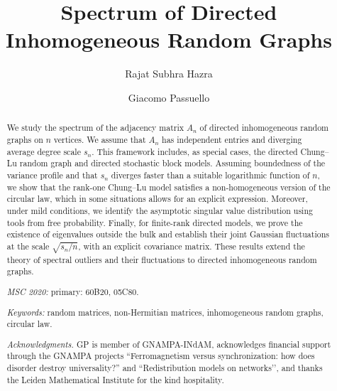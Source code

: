 \documentclass[11pt,oneside]{amsart}
\theoremstyle{plain}
\numberwithin{equation}{section}
\begin{document}
\title{Spectrum of Directed Inhomogeneous Random Graphs}

\author{Rajat Subhra Hazra}
\address{Mathematical Institute, Leiden University, Gorlaeus Gebouw,
BW-vleugel, Einsteinweg 55, 2333 CC Leiden, The Netherlands.}


\author{Giacomo Passuello}
\address{Delft Institute of Applied Mathematics (DIAM),
	Delft University of Technology, 
    Mekelweg 4, 2628 CD Delft, The Netherlands.}




\maketitle


	\begin{abstract}
We study the spectrum of the adjacency matrix $A_n$ of directed inhomogeneous random graphs on $n$ vertices. We assume that $A_n$ has independent entries and diverging average degree scale $s_n$. This framework includes, as special cases, the directed Chung--Lu random graph and directed stochastic block models. 
Assuming boundedness of the variance profile and that $s_n$ diverges faster than a suitable logarithmic function of $n$, we show that the rank-one Chung--Lu model satisfies a non-homogeneous version of the circular law, which in some situations allows for an explicit expression. Moreover, under mild conditions, we identify the asymptotic singular value distribution using tools from free probability.
Finally, for finite-rank directed models, we prove the existence of eigenvalues outside the bulk and establish their joint Gaussian fluctuations at the scale $\sqrt{s_n/n}$, with an explicit covariance matrix. These results extend the theory of spectral outliers and their fluctuations to directed inhomogeneous random graphs.


   \par\bigskip\noindent
   {\it MSC 2020:} primary:  60B20, 05C80.
   \par\smallskip\noindent
   {\it Keywords:} random matrices, non-Hermitian matrices, inhomogeneous random graphs, circular law.\\

 
    \par\smallskip\noindent
    {\it Acknowledgments.} 
    GP is member of GNAMPA-INdAM, acknowledges financial support through the GNAMPA projects %
``Ferromagnetism versus synchronization: how does disorder destroy universality?'' and 
``Redistribution models on networks’’, and thanks the Leiden Mathematical Institute for the kind hospitality.
\end{abstract}
\end{document}
